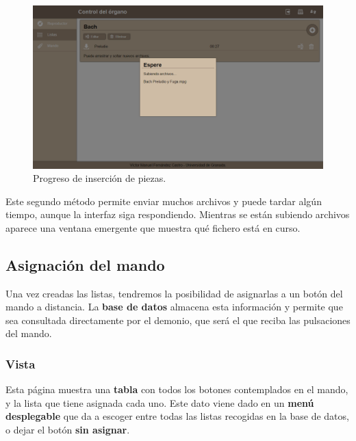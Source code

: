 \smallskip

\begin{figure}[H]
	\noindent \begin{centering}
		\includegraphics[width=\linewidth*3/4]{capitulo5/cap_ins_pieza}
		\par\end{centering}
	\smallskip
	\caption{\label{fig:cap_ins_pieza} Progreso de inserción de piezas.}
\end{figure} 

\smallskip

Este segundo método permite enviar muchos archivos y puede tardar algún tiempo, aunque la interfaz siga respondiendo. Mientras se están subiendo archivos aparece una ventana emergente que muestra qué fichero está en curso.

\subsection{Asignación del mando}

Una vez creadas las listas, tendremos la posibilidad de asignarlas a un botón del mando a distancia. La \textbf{base de datos} almacena esta información y permite que sea consultada directamente por el demonio, que será el que reciba las pulsaciones del mando.

\subsubsection{Vista}

Esta página muestra una \textbf{tabla} con todos los botones contemplados en el mando, y la lista que tiene asignada cada uno. Este dato viene dado en un \textbf{menú desplegable} que da a escoger entre todas las listas recogidas en la base de datos, o dejar el botón \textbf{sin asignar}.

